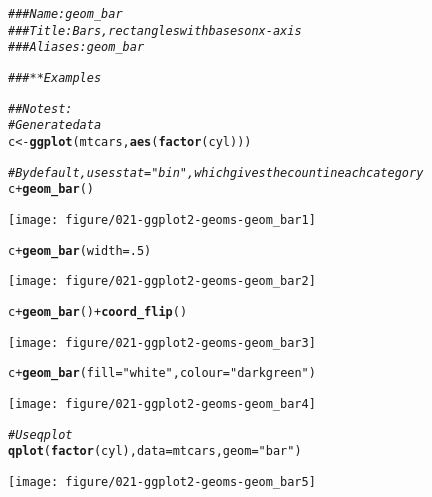 \documentclass[a4paper,titlepage]{tufte-handout}\usepackage[]{graphicx}\usepackage[]{color}
\makeatletter
\def\maxwidth{ %
  \ifdim\Gin@nat@width>\linewidth
    \linewidth
  \else
    \Gin@nat@width
  \fi
}
\newcommand{\hlnum}[1]{\textcolor[rgb]{0.686,0.059,0.569}{#1}}%
\newcommand{\hlstr}[1]{\textcolor[rgb]{0.192,0.494,0.8}{#1}}%
\newcommand{\hlcom}[1]{\textcolor[rgb]{0.678,0.584,0.686}{\textit{#1}}}%
\newcommand{\hlopt}[1]{\textcolor[rgb]{0,0,0}{#1}}%
\newcommand{\hlstd}[1]{\textcolor[rgb]{0.345,0.345,0.345}{#1}}%
\newcommand{\hlkwb}[1]{\textcolor[rgb]{0.69,0.353,0.396}{#1}}%
\newcommand{\hlkwc}[1]{\textcolor[rgb]{0.333,0.667,0.333}{#1}}%
\newcommand{\hlkwd}[1]{\textcolor[rgb]{0.737,0.353,0.396}{\textbf{#1}}}%
\newenvironment{kframe}{%
 \def\at@end@of@kframe{}%
 \ifinner\ifhmode%
  \def\at@end@of@kframe{\end{minipage}}%
  \begin{minipage}{\columnwidth}%
 \fi\fi%
 \def\FrameCommand##1{\hskip\@totalleftmargin \hskip-\fboxsep
 \colorbox{shadecolor}{##1}\hskip-\fboxsep
     \hskip-\linewidth \hskip-\@totalleftmargin \hskip\columnwidth}%
 \MakeFramed {\advance\hsize-\width
   \@totalleftmargin\z@ \linewidth\hsize
   \@setminipage}}%
 {\par\unskip\endMakeFramed%
 \at@end@of@kframe}
\newenvironment{knitrout}{}{} %
\makeatother
\begin{document}
\begin{knitrout}
\color{fgcolor}\begin{kframe}
\begin{alltt}
\hlcom{### Name: geom_bar}
\hlcom{### Title: Bars, rectangles with bases on x-axis}
\hlcom{### Aliases: geom_bar}

\hlcom{### ** Examples}

\hlcom{## No test: }
\hlcom{# Generate data}
\hlstd{c} \hlkwb{<-} \hlkwd{ggplot}\hlstd{(mtcars,} \hlkwd{aes}\hlstd{(}\hlkwd{factor}\hlstd{(cyl)))}

\hlcom{# By default, uses stat="bin", which gives the count in each category}
\hlstd{c} \hlopt{+} \hlkwd{geom_bar}\hlstd{()}
\end{alltt}
\end{kframe}
\texttt{[image: figure/021-ggplot2-geoms-geom\_bar1]} 
\begin{kframe}\begin{alltt}
\hlstd{c} \hlopt{+} \hlkwd{geom_bar}\hlstd{(}\hlkwc{width}\hlstd{=}\hlnum{.5}\hlstd{)}
\end{alltt}
\end{kframe}
\texttt{[image: figure/021-ggplot2-geoms-geom\_bar2]} 
\begin{kframe}\begin{alltt}
\hlstd{c} \hlopt{+} \hlkwd{geom_bar}\hlstd{()} \hlopt{+} \hlkwd{coord_flip}\hlstd{()}
\end{alltt}
\end{kframe}
\texttt{[image: figure/021-ggplot2-geoms-geom\_bar3]} 
\begin{kframe}\begin{alltt}
\hlstd{c} \hlopt{+} \hlkwd{geom_bar}\hlstd{(}\hlkwc{fill}\hlstd{=}\hlstr{"white"}\hlstd{,} \hlkwc{colour}\hlstd{=}\hlstr{"darkgreen"}\hlstd{)}
\end{alltt}
\end{kframe}
\texttt{[image: figure/021-ggplot2-geoms-geom\_bar4]} 
\begin{kframe}\begin{alltt}
\hlcom{# Use qplot}
\hlkwd{qplot}\hlstd{(}\hlkwd{factor}\hlstd{(cyl),} \hlkwc{data}\hlstd{=mtcars,} \hlkwc{geom}\hlstd{=}\hlstr{"bar"}\hlstd{)}
\end{alltt}
\end{kframe}
\texttt{[image: figure/021-ggplot2-geoms-geom\_bar5]} 
\begin{kframe}\begin{alltt}

\end{alltt}
\end{kframe}
\end{knitrout}
\end{document}
